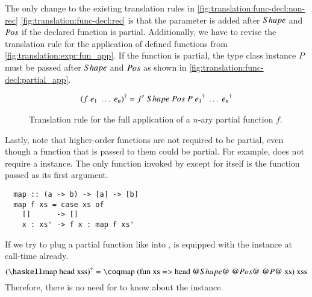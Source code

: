 The only change to the existing translation rules in \autoref{fig:translation:func-decl:non-rec} \autoref{fig:translation:func-decl:rec} is that the parameter  is added after $Shape$ and $Pos$ if the declared function is partial.
Additionally, we have to revise the translation rule for the application of defined functions from \autoref{fig:translation:expr:fun_app}.
If the function is partial, the type class instance $P$ must be passed after $Shape$ and $Pos$ as shown in \autoref{fig:translation:func-decl:partial_app}.
\begin{figure}[H]
  \begin{align*}
    {(f\;e_1\;\ldots\;e_n)}^{\dagger} = f'\;Shape\;Pos\;P\;{e_1}^{\dagger}\;\ldots\;{e_n}^{\dagger}
  \end{align*}
  \caption{Translation rule for the full application of a $n$-ary partial function $f$.}
  \label{fig:translation:func-decl:partial_app}
\end{figure}

Lastly, note that higher-order functions are not required to be partial, even though a function that is passed to them could be partial.
For example,  does not require a  instance.
The only function invoked by  except for itself is the function passed as its first argument.
\begin{verbatim}
  map :: (a -> b) -> [a] -> [b]
  map f xs = case xs of
    []      -> []
    x : xs' -> f x : map f xs'
\end{verbatim}
If we try to plug a partial function like  into ,  is equipped with the  instance at call-time already.
\[
  \toCoq{(\haskellM{map head xss})}
  =
  \coqM{map (fun xs => head @$\Shape$@ @$\Pos$@ @$P$@ xs) xss}
\]
Therefore, there is no need for  to know about the  instance.
